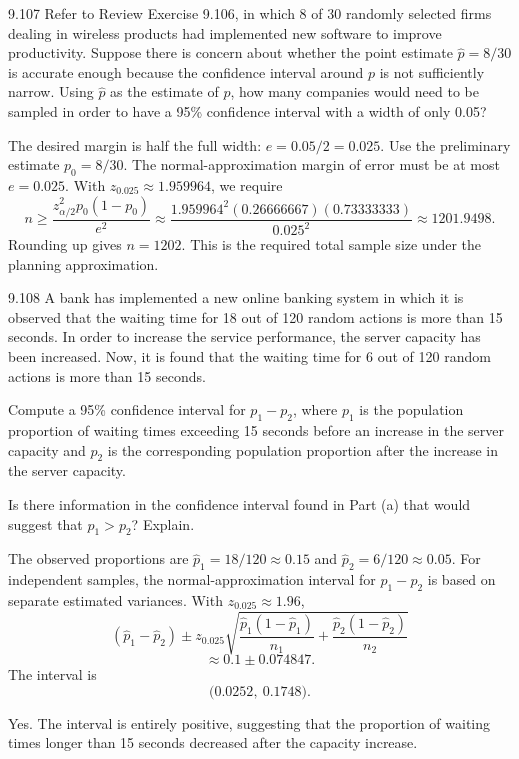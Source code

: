 \documentclass[11pt,oneside]{article}
\begin{document}
\begin{exercise}{9.107}
Refer to Review Exercise 9.106, in which 8 of 30 randomly selected firms dealing in wireless products had implemented new software to improve productivity. Suppose there is concern about whether the point estimate $\hat p=8/30$ is accurate enough because the confidence interval around $p$ is not sufficiently narrow. Using $\hat p$ as the estimate of $p$, how many companies would need to be sampled in order to have a 95\% confidence interval with a width of only 0.05?
\end{exercise}
\begin{solution}
The desired margin is half the full width: $e=0.05/2=0.025$. Use the preliminary estimate $p_0=8/30$. The normal-approximation margin of error must be at most $e=0.025$. With $z_{0.025}\approx 1.959964$, we require
\[
n\ge \frac{z_{\alpha/2}^2p_0(1-p_0)}{e^2}\approx \frac{1.959964^2(0.26666667)(0.73333333)}{0.025^2}\approx 1201.9498.
\]
Rounding up gives $\boxed{n=1202}$. This is the required total sample size under the planning approximation.
\end{solution}

\begin{exercise}{9.108}
A bank has implemented a new online banking system in which it is observed that the waiting time for 18 out of 120 random actions is more than 15 seconds. In order to increase the service performance, the server capacity has been increased. Now, it is found that the waiting time for 6 out of 120 random actions is more than 15 seconds.
\begin{exercisesubparts}
\item Compute a 95\% confidence interval for $p_1-p_2$, where $p_1$ is the population proportion of waiting times exceeding 15 seconds before an increase in the server capacity and $p_2$ is the corresponding population proportion after the increase in the server capacity.
\item Is there information in the confidence interval found in Part (a) that would suggest that $p_1>p_2$? Explain.
\end{exercisesubparts}
\end{exercise}
\begin{solution}
\begin{exercisesubparts}
\item The observed proportions are $\hat p_1=18/120\approx0.15$ and $\hat p_2=6/120\approx0.05$. For independent samples, the normal-approximation interval for $p_1-p_2$ is based on separate estimated variances. With $z_{0.025}\approx1.96$,
\[
(\hat p_1-\hat p_2)\pm z_{0.025}\sqrt{\frac{\hat p_1(1-\hat p_1)}{n_1}+\frac{\hat p_2(1-\hat p_2)}{n_2}}
\]
\[
\approx 0.1\pm0.074847.
\]
The interval is 
\[
\boxed{\bigl(0.0252,\ 0.1748\bigr)}.
\]

\item Yes. The interval is entirely positive, suggesting that the proportion of waiting times longer than 15 seconds decreased after the capacity increase.
\end{exercisesubparts}
\end{solution}
\end{document}
